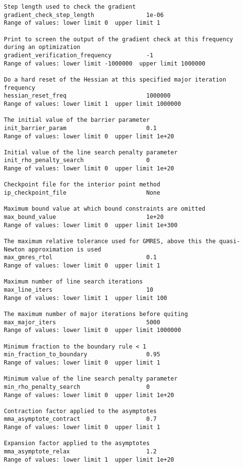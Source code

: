 \documentclass[12pt]{article}
\begin{document}
{\begin{verbatim}
Step length used to check the gradient
gradient_check_step_length               1e-06
Range of values: lower limit 0  upper limit 1

Print to screen the output of the gradient check at this frequency during an optimization
gradient_verification_frequency          -1
Range of values: lower limit -1000000  upper limit 1000000

Do a hard reset of the Hessian at this specified major iteration frequency
hessian_reset_freq                       1000000
Range of values: lower limit 1  upper limit 1000000

The initial value of the barrier parameter
init_barrier_param                       0.1
Range of values: lower limit 0  upper limit 1e+20

Initial value of the line search penalty parameter
init_rho_penalty_search                  0
Range of values: lower limit 0  upper limit 1e+20

Checkpoint file for the interior point method
ip_checkpoint_file                       None

Maximum bound value at which bound constraints are omitted
max_bound_value                          1e+20
Range of values: lower limit 0  upper limit 1e+300

The maximum relative tolerance used for GMRES, above this the quasi-Newton approximation is used
max_gmres_rtol                           0.1
Range of values: lower limit 0  upper limit 1

Maximum number of line search iterations
max_line_iters                           10
Range of values: lower limit 1  upper limit 100

The maximum number of major iterations before quiting
max_major_iters                          5000
Range of values: lower limit 0  upper limit 1000000

Minimum fraction to the boundary rule < 1
min_fraction_to_boundary                 0.95
Range of values: lower limit 0  upper limit 1

Minimum value of the line search penalty parameter
min_rho_penalty_search                   0
Range of values: lower limit 0  upper limit 1e+20

Contraction factor applied to the asymptotes
mma_asymptote_contract                   0.7
Range of values: lower limit 0  upper limit 1

Expansion factor applied to the asymptotes
mma_asymptote_relax                      1.2
Range of values: lower limit 1  upper limit 1e+20


\end{verbatim}}
\end{document}
